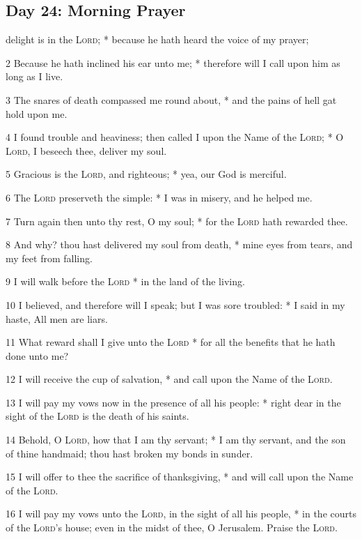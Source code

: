 \subsection{Day 24: Morning Prayer}
 delight is in the {\textsc{Lord}}; * because he hath heard the voice of my prayer;\par
2 Because he hath inclined his ear unto me; * therefore will I call upon him as long as I live.\par
3 The snares of death compassed me round about, * and the pains of hell gat hold upon me.\par
4 I found trouble and heaviness; then called I upon the Name of the {\textsc{Lord}}; * O {\textsc{Lord}}, I beseech thee, deliver my soul.\par
5 Gracious is the {\textsc{Lord}}, and righteous; * yea, our God is merciful.\par
6 The {\textsc{Lord}} preserveth the simple: * I was in misery, and he helped me.\par
7 Turn again then unto thy rest, O my soul; * for the {\textsc{Lord}} hath rewarded thee.\par
8 And why? thou hast delivered my soul from death, * mine eyes from tears, and my feet from falling.\par
9 I will walk before the {\textsc{Lord}} * in the land of the living.\par
10 I believed, and therefore will I speak; but I was sore troubled: * I said in my haste, All men are liars.\par
11 What reward shall I give unto the {\textsc{Lord}} * for all the benefits that he hath done unto me?\par
12 I will receive the cup of salvation, * and call upon the Name of the {\textsc{Lord}}.\par
13 I will pay my vows now in the presence of all his people: * right dear in the sight of the {\textsc{Lord}} is the death of his saints.\par
14 Behold, O {\textsc{Lord}}, how that I am thy servant; * I am thy servant, and the son of thine handmaid; thou hast broken my bonds in sunder.\par
15 I will offer to thee the sacrifice of thanksgiving, * and will call upon the Name of the {\textsc{Lord}}.\par
16 I will pay my vows unto the {\textsc{Lord}}, in the sight of all his people, * in the courts of the {\textsc{Lord}}'s house; even in the midst of thee, O Jerusalem. Praise the {\textsc{Lord}}.
